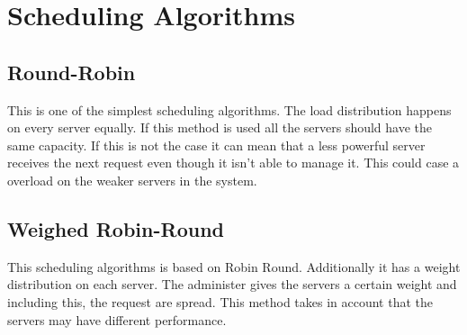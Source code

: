 \documentclass[12p]{article}
\begin{document}
	
	\newpage
	\section{Scheduling Algorithms}
		
	\subsection{Round-Robin}
	This is one of the simplest scheduling algorithms. The load distribution happens on every server equally. If this method is used all the servers should have the same capacity. If this is not the case it can mean that a less powerful server receives the next request even though it isn't able to manage it. This could case a overload on the weaker servers in the system. 
	
	\subsection{Weighed Robin-Round}
	This scheduling algorithms is based on Robin Round. Additionally it has a weight distribution on each server. The administer gives the servers a certain weight and including this, the request are spread. This method takes in account that the servers may have different performance. 
	
\end{document}
